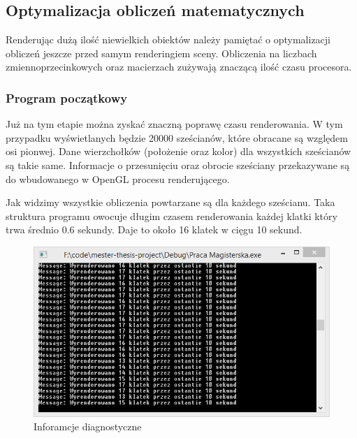 \subsection{Optymalizacja obliczeń matematycznych}
\thispagestyle{empty}
\par\indent

Renderując dużą ilość niewielkich obiektów należy pamiętać o optymalizacji obliczeń jeszcze przed samym renderingiem sceny. Obliczenia na liczbach zmiennoprzecinkowych oraz macierzach zużywają znaczącą ilość czasu procesora. 

\subsubsection{Program początkowy}
\thispagestyle{empty}
\par\indent

Już na tym etapie można zyskać znaczną poprawę czasu renderowania.  W tym przypadku wyświetlanych będzie 20000 sześcianów, które obracane są względem osi pionwej. Dane wierzchołków (położenie oraz kolor) dla wszystkich sześcianów są takie same. Informacje o przesunięciu oraz obrocie sześciany przekazywane są do wbudowanego w OpenGL procesu renderującego.





Jak widzimy wszystkie obliczenia powtarzane są dla każdego sześcianu. Taka struktura programu owocuje długim czasem renderowania każdej klatki który trwa średnio 0.6 sekundy. Daje to około 16 klatek w cięgu 10 sekund.

\begin{figure}[h]
	\includegraphics[width=\textwidth]{images/optimized0_console}
	\caption{Inforamcje diagnostyczne}
\end{figure}



